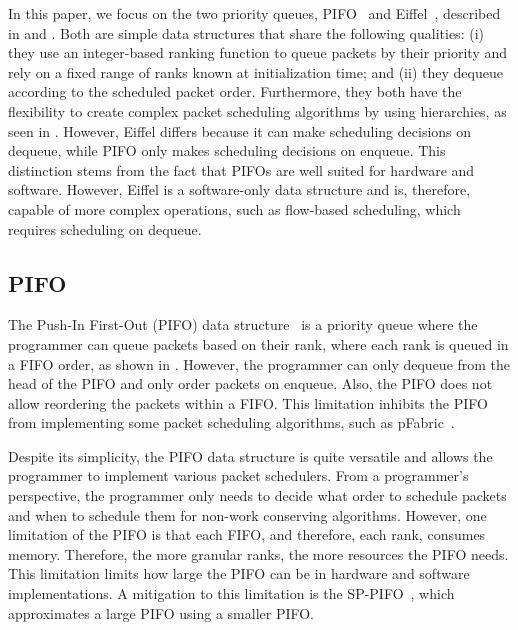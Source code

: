 \documentclass[sigconf, nonacm]{acmart}
\begin{document}
In this paper, we focus on the two priority queues, PIFO~\cite{Sivaraman2016} and Eiffel~\cite{Saeed2019}, described in  and . Both are simple data structures that share the following qualities: (i) they use an integer-based ranking function to queue packets by their priority and rely on a fixed range of ranks known at initialization time; and (ii) they dequeue according to the scheduled packet order. Furthermore, they both have the flexibility to create complex packet scheduling algorithms by using hierarchies, as seen in . However, Eiffel differs because it can make scheduling decisions on dequeue, while PIFO only makes scheduling decisions on enqueue. This distinction stems from the fact that PIFOs are well suited for hardware and software. However, Eiffel is a software-only data structure and is, therefore, capable of more complex operations, such as flow-based scheduling, which requires scheduling on dequeue.


\subsection{PIFO} \label{sec:pifo}

The Push-In First-Out (PIFO) data structure~\cite{Sivaraman2016} is a priority queue where the programmer can queue packets based on their rank, where each rank is queued in a FIFO order, as shown in . However, the programmer can only dequeue from the head of the PIFO and only order packets on enqueue. Also, the PIFO does not allow reordering the packets within a FIFO. This limitation inhibits the PIFO from implementing some packet scheduling algorithms, such as pFabric~\cite{alizadeh2013pfabric}.

Despite its simplicity, the PIFO data structure is quite versatile and allows the programmer to implement various packet schedulers. From a programmer's perspective, the programmer only needs to decide what order to schedule packets and when to schedule them for non-work conserving algorithms. However, one limitation of the PIFO is that each FIFO, and therefore, each rank, consumes memory. Therefore, the more granular ranks, the more resources the PIFO needs. This limitation limits how large the PIFO can be in hardware and software implementations. A mitigation to this limitation is the SP-PIFO~\cite{Alcoz2020}, which approximates a large PIFO using a smaller PIFO.
\end{document}
